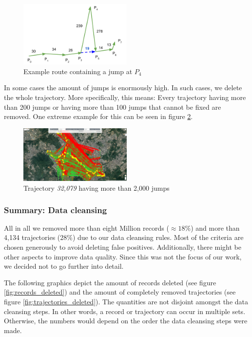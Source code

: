 \documentclass[10pt]{sig-alternate}
\begin{document}
\begin{figure}[ht]
\centering
\includegraphics[width=0.5\textwidth]{img/jumps.png}
\caption{Example route containing a jump at $P_4$}
\label{fig:jump}
\end{figure}

In some cases the amount of jumps is enormously high. In such cases, we delete the whole trajectory. More specifically, this means: Every trajectory having more than 200 jumps or having more than 100 jumps that cannot be fixed are removed. One extreme example for this can be seen in figure \ref{fig:more_jumps}.

\begin{figure}[ht]
\centering
\includegraphics[width=0.5\textwidth]{img/more_jumps.png}
\caption{Trajectory \textit{32,079} having more than 2,000 jumps}
\label{fig:more_jumps}
\end{figure}

\subsubsection{Summary: Data cleansing}
All in all we removed more than eight Million records ($\approx 18\%$) and more than 4,134 trajectories ($28\%$) due to our data cleansing rules. Most of the criteria are chosen generously to avoid deleting false positives. Additionally, there might be other aspects to improve data quality. Since this was not the focus of our work, we decided not to go further into detail.


The following graphics depict the amount of records deleted (see figure \ref{fig:records_deleted}) and the amount of completely removed trajectories (see figure \ref{fig:trajectories_deleted}). The quantities are not disjoint amongst the data cleansing steps. In other words, a record or trajectory can occur in multiple sets. Otherwise, the numbers would depend on the order the data cleansing steps were made.
\end{document}

